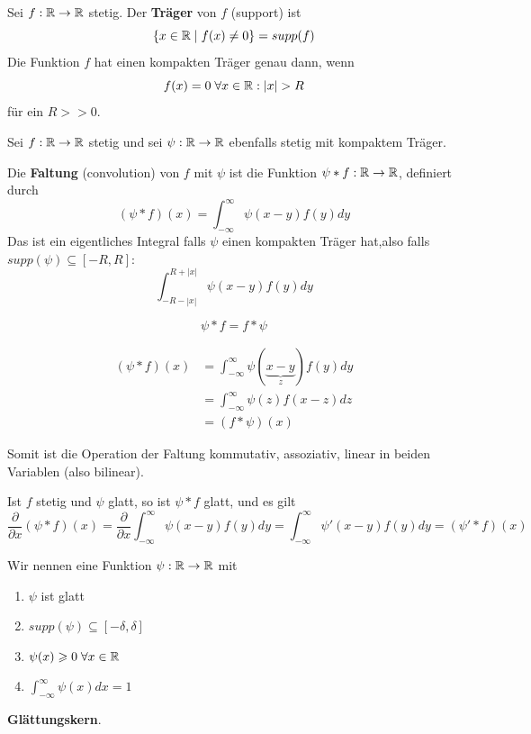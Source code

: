 \documentclass[main.tex]{subfiles}
\begin{document}
\begin{Definition}[Träger]
  Sei $f: \mathbb{R} \to \mathbb{R}$ stetig. Der \textbf{Träger} von $f$ (support) ist
  $$\{x \in \mathbb{R} \mid f(x) \neq 0\} = supp(f)$$
  Die Funktion $f$ hat einen kompakten Träger genau dann, wenn
  $$f(x) = 0 \;\forall x \in \mathbb{R} : |x| > R$$
  für ein $R >> 0$.
\end{Definition}

\begin{Definition}[Faltung]
  Sei $f: \mathbb{R} \to \mathbb{R}$ stetig und sei $\psi : \mathbb{R} \to \mathbb{R}$ ebenfalls stetig mit kompaktem Träger.

  Die \textbf{Faltung} (convolution) von $f$ mit $\psi$ ist die Funktion $\psi * f : \mathbb{R} \to \mathbb{R}$, definiert durch
  $$(\psi * f)(x) = \int_{-\infty}^\infty \psi(x-y)f(y)dy$$
  Das ist ein eigentliches Integral falls $\psi$ einen kompakten Träger hat,also falls $supp(\psi) \subseteq [-R,R]$:
  $$\int_{-R - |x|}^{R + |x|} \psi(x-y)f(y)dy$$
\end{Definition}

\begin{Theorem}
  $$\psi * f = f * \psi$$
\end{Theorem}

\begin{Beweis}
  $$\begin{aligned}
    (\psi * f)(x) & = \int_{-\infty}^\infty \psi(\underbrace{x-y}_{z})f(y)dy \\
    & = \int_{-\infty}^\infty \psi(z)f(x-z)dz \\
    & = (f*\psi) (x)
  \end{aligned}$$
\end{Beweis}

\begin{Bemerkung}
  Somit ist die Operation der Faltung kommutativ, assoziativ, linear in beiden Variablen (also bilinear).
\end{Bemerkung}

\begin{Theorem}
  Ist $f$ stetig und $\psi$ glatt, so ist $\psi * f$ glatt, und es gilt
  $$\dfrac{\partial}{\partial x} (\psi * f)(x) = \dfrac{\partial}{\partial x} \int_{-\infty}^\infty \psi(x-y)f(y)dy = \int_{-\infty}^\infty \psi'(x-y)f(y) dy = (\psi' * f)(x)$$
\end{Theorem}

\begin{Definition}[Glättungskern]
  Wir nennen eine Funktion $\psi: \mathbb{R} \to \mathbb{R}$ mit
  \begin{enumerate}
    \item $\psi$ ist glatt
    \item $supp(\psi) \subseteq [- \delta, \delta]$
    \item $\psi(x) \geqslant 0 \;\forall x \in \mathbb{R}$
    \item $\int_{-\infty}^\infty \psi(x) dx = 1$
  \end{enumerate}
  \textbf{Glättungskern}.
\end{Definition}
\end{document}

